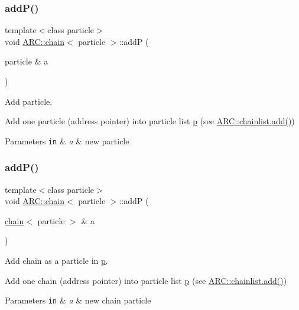 \subsubsection{\texorpdfstring{add\+P()}{addP()}\hspace{0.1cm}{\footnotesize\ttfamily [1/3]}}
{\footnotesize\ttfamily template$<$class particle$>$ \\
void \hyperlink{classARC_1_1chain}{A\+R\+C\+::chain}$<$ particle $>$\+::addP (\begin{DoxyParamCaption}\item[{particle \&}]{a }\end{DoxyParamCaption})\hspace{0.3cm}{\ttfamily [inline]}}



Add particle. 

Add one particle (address pointer) into particle list \hyperlink{classARC_1_1chain_af1793b656e139e1f87c2e0a55f87514b}{p} (see \hyperlink{classARC_1_1chainlist_afa780edfa301cc22cf189e63d7a59c2c}{A\+R\+C\+::chainlist.\+add()}) 
\begin{DoxyParams}[1]{Parameters}
\mbox{\tt in}  & {\em a} & new particle \\
\hline
\end{DoxyParams}
\hypertarget{classARC_1_1chain_a22a0c3e8b42954edee0d2f66a27e8640}{}\label{classARC_1_1chain_a22a0c3e8b42954edee0d2f66a27e8640} 
\subsubsection{\texorpdfstring{add\+P()}{addP()}\hspace{0.1cm}{\footnotesize\ttfamily [2/3]}}
{\footnotesize\ttfamily template$<$class particle$>$ \\
void \hyperlink{classARC_1_1chain}{A\+R\+C\+::chain}$<$ particle $>$\+::addP (\begin{DoxyParamCaption}\item[{\hyperlink{classARC_1_1chain}{chain}$<$ particle $>$ \&}]{a }\end{DoxyParamCaption})\hspace{0.3cm}{\ttfamily [inline]}}



Add chain as a particle in \hyperlink{classARC_1_1chain_af1793b656e139e1f87c2e0a55f87514b}{p}. 

Add one chain (address pointer) into particle list \hyperlink{classARC_1_1chain_af1793b656e139e1f87c2e0a55f87514b}{p} (see \hyperlink{classARC_1_1chainlist_afa780edfa301cc22cf189e63d7a59c2c}{A\+R\+C\+::chainlist.\+add()}) 
\begin{DoxyParams}[1]{Parameters}
\mbox{\tt in}  & {\em a} & new chain particle \\
\hline
\end{DoxyParams}
\hypertarget{classARC_1_1chain_a658a7b777ac45e7900990dcc6ef0b752}{}\label{classARC_1_1chain_a658a7b777ac45e7900990dcc6ef0b752} 
